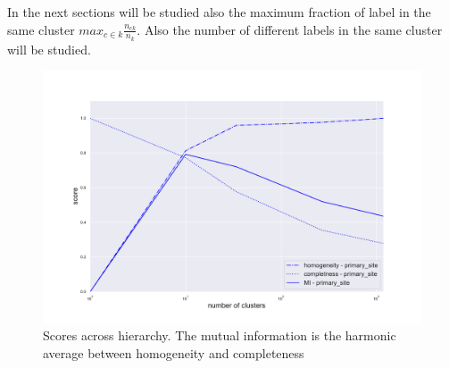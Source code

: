 In the next sections will be studied also the maximum fraction of label in the same cluster \(max_{c\in k}\frac{n_{c k}}{n_k}\).
Also the number of different labels in the same cluster will be studied.
\begin{figure}[htb!]
    \centering
    \includegraphics[width=0.9\linewidth]{pictures/topic/gtex/oversigma_10tissue/metric_scores_primarysite.pdf}
    \caption{Scores across hierarchy. The mutual information is the harmonic average between homogeneity and completeness}
    \label{fig:topic/metric_scores_primarysite}
\end{figure}
\FloatBarrier
